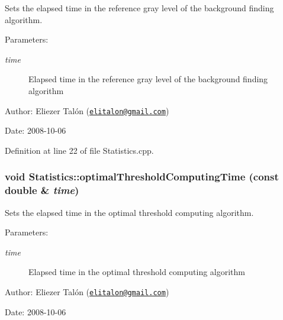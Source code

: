 Sets the elapsed time in the reference gray level of the background finding algorithm. 

\begin{Desc}
\item[Parameters:]
\begin{description}
\item[{\em time}]Elapsed time in the reference gray level of the background finding algorithm\end{description}
\end{Desc}
\begin{Desc}
\item[Author:]Eliezer Talón (\href{mailto:elitalon@gmail.com}{\tt elitalon@gmail.com}) \end{Desc}
\begin{Desc}
\item[Date:]2008-10-06 \end{Desc}


Definition at line 22 of file Statistics.cpp.\hypertarget{class_statistics_eed35a930f29f4596f3715306e1e1dbc}{
\subsubsection[optimalThresholdComputingTime]{\setlength{\rightskip}{0pt plus 5cm}void Statistics::optimalThresholdComputingTime (const double \& {\em time})}}
\label{class_statistics_eed35a930f29f4596f3715306e1e1dbc}


Sets the elapsed time in the optimal threshold computing algorithm. 

\begin{Desc}
\item[Parameters:]
\begin{description}
\item[{\em time}]Elapsed time in the optimal threshold computing algorithm\end{description}
\end{Desc}
\begin{Desc}
\item[Author:]Eliezer Talón (\href{mailto:elitalon@gmail.com}{\tt elitalon@gmail.com}) \end{Desc}
\begin{Desc}
\item[Date:]2008-10-06 \end{Desc}



